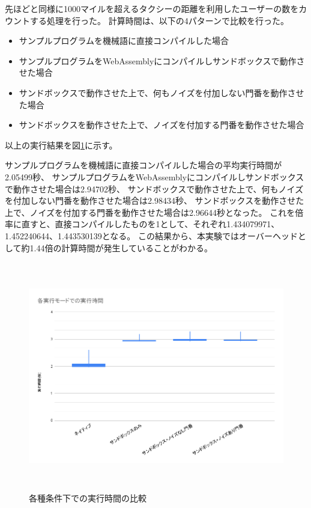 \documentclass[a4paper,11pt]{jreport}
\begin{document}
先ほどと同様に1000マイルを超えるタクシーの距離を利用したユーザーの数をカウントする処理を行った。
計算時間は、以下の4パターンで比較を行った。
\begin{itemize}
    \item サンプルプログラムを機械語に直接コンパイルした場合
    \item サンプルプログラムをWebAssemblyにコンパイルしサンドボックスで動作させた場合
    \item サンドボックスで動作させた上で、何もノイズを付加しない門番を動作させた場合
    \item サンドボックスを動作させた上で、ノイズを付加する門番を動作させた場合
\end{itemize}

以上の実行結果を図\ref{fig:time}に示す。

サンプルプログラムを機械語に直接コンパイルした場合の平均実行時間が2.05499秒、
サンプルプログラムをWebAssemblyにコンパイルしサンドボックスで動作させた場合は2.94702秒、
サンドボックスで動作させた上で、何もノイズを付加しない門番を動作させた場合は2.98434秒、
サンドボックスを動作させた上で、ノイズを付加する門番を動作させた場合は2.96644秒となった。
これを倍率に直すと、直接コンパイルしたものを1として、それぞれ1.434079971、1.452240644、1.443530139となる。
この結果から、本実験ではオーバーヘッドとして約1.44倍の計算時間が発生していることがわかる。

\begin{figure}[htbp]
    \centering
\includegraphics[height=100mm]{time.png}
    \caption{各種条件下での実行時間の比較}
    \label{fig:time}
\end{figure}
\end{document}
